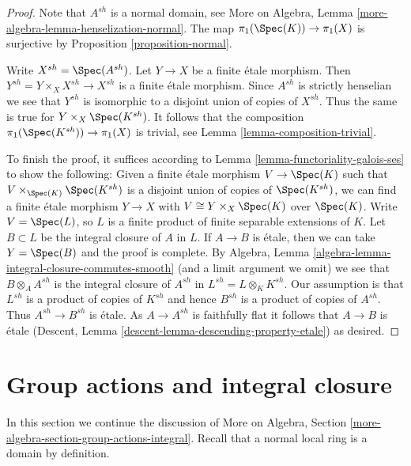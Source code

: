 \begin{proof}
Note that $A^{sh}$ is a normal domain, see
More on Algebra, Lemma \ref{more-algebra-lemma-henselization-normal}.
The map $\pi_1(\Spec(K)) \to \pi_1(X)$ is surjective by
Proposition \ref{proposition-normal}.

\medskip\noindent
Write $X^{sh} = \Spec(A^{sh})$. Let $Y \to X$ be a finite \'etale morphism.
Then $Y^{sh} = Y \times_X X^{sh} \to X^{sh}$ is a finite \'etale morphism.
Since $A^{sh}$ is strictly henselian we see that $Y^{sh}$ is isomorphic
to a disjoint union of copies of $X^{sh}$. Thus the same is true for
$Y \times_X \Spec(K^{sh})$. It follows that the composition
$\pi_1(\Spec(K^{sh})) \to \pi_1(X)$ is trivial, see
Lemma \ref{lemma-composition-trivial}.

\medskip\noindent
To finish the proof, it suffices according to
Lemma \ref{lemma-functoriality-galois-ses}
to show the following: Given a finite \'etale morphism
$V \to \Spec(K)$ such that $V \times_{\Spec(K)} \Spec(K^{sh})$
is a disjoint union of copies of $\Spec(K^{sh})$, we can find a
finite \'etale morphism
$Y \to X$ with $V \cong Y \times_X \Spec(K)$ over $\Spec(K)$.
Write $V = \Spec(L)$, so $L$ is a finite product of
finite separable extensions of $K$.
Let $B \subset L$ be the integral closure of $A$ in $L$.
If $A \to B$ is \'etale, then we can take $Y = \Spec(B)$
and the proof is complete. By
Algebra, Lemma \ref{algebra-lemma-integral-closure-commutes-smooth}
(and a limit argument we omit)
we see that $B \otimes_A A^{sh}$ is the integral closure of
$A^{sh}$ in $L^{sh} = L \otimes_K K^{sh}$.
Our assumption is that $L^{sh}$ is a product of copies of
$K^{sh}$ and hence $B^{sh}$ is a product of copies of $A^{sh}$.
Thus $A^{sh} \to B^{sh}$ is \'etale. As $A \to A^{sh}$ is
faithfully flat it follows that $A \to B$ is \'etale
(Descent, Lemma \ref{descent-lemma-descending-property-etale})
as desired.
\end{proof}







\section{Group actions and integral closure}
\label{section-group-actions-integral}

\noindent
In this section we continue the discussion of
More on Algebra, Section \ref{more-algebra-section-group-actions-integral}.
Recall that a normal local ring is a domain by definition.

